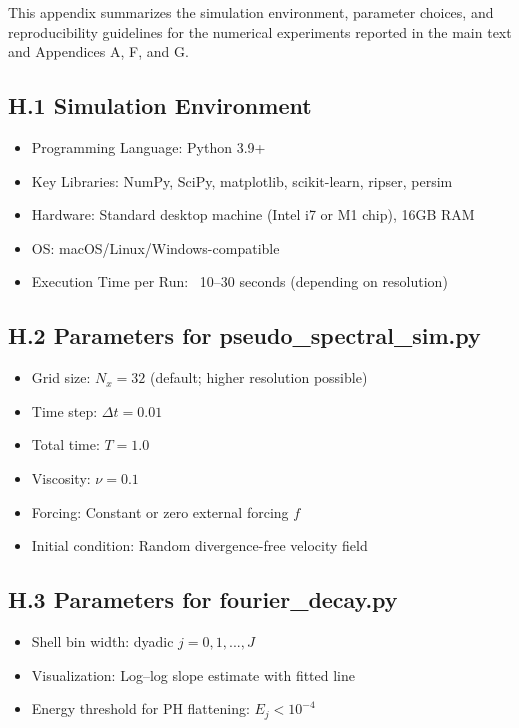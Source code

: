\documentclass[11pt]{article}
\theoremstyle{definition}
\begin{document}
This appendix summarizes the simulation environment, parameter choices, and reproducibility guidelines for the numerical experiments reported in the main text and Appendices A, F, and G.

\subsection*{H.1 Simulation Environment}

\begin{itemize}
  \item Programming Language: Python 3.9+
  \item Key Libraries: NumPy, SciPy, matplotlib, scikit-learn, ripser, persim
  \item Hardware: Standard desktop machine (Intel i7 or M1 chip), 16GB RAM
  \item OS: macOS/Linux/Windows-compatible
  \item Execution Time per Run: ~10–30 seconds (depending on resolution)
\end{itemize}

\subsection*{H.2 Parameters for pseudo\_spectral\_sim.py}

\begin{itemize}
  \item Grid size: \( N_x = 32 \) (default; higher resolution possible)
  \item Time step: \( \Delta t = 0.01 \)
  \item Total time: \( T = 1.0 \)
  \item Viscosity: \( \nu = 0.1 \)
  \item Forcing: Constant or zero external forcing \( f \)
  \item Initial condition: Random divergence-free velocity field
\end{itemize}

\subsection*{H.3 Parameters for fourier\_decay.py}

\begin{itemize}
  \item Shell bin width: dyadic \( j = 0,1,...,J \)
  \item Visualization: Log–log slope estimate with fitted line
  \item Energy threshold for PH flattening: \( E_j < 10^{-4} \)
\end{itemize}
\end{document}
